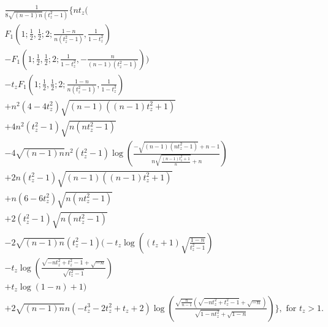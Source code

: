 \begin{multline}
  \label{eq:133}
  \frac{1}{8
   \sqrt{(n-1) n} \left(t_z^2-1\right)}
 \Bigg\{
 n t_z \Bigg(\\
   F_1\left(1;\frac{1}{2},\frac{1}{2};2;\frac{1-n}{n
       \left(t_z^2-1\right)},\frac{1}{1-t_z^2}\right)\\
   -F_1\left(1;\frac{1}{2},\frac{1}{2};2;
     \frac{1}{1-t_z^2},-\frac{n}{(n-1) \left(t_z^2-1\right)}\right)
 \Bigg)\\
 -t_z
   F_1\left(1;\frac{1}{2},\frac{1}{2};2;\frac{1-n}{n
       \left(t_z^2-1\right)},\frac{1}{1-t_z^2}\right)\\
   +n^2 (4-4 t_z^2)
   \sqrt{(n-1) \left((n-1) t_z^2+1\right)}\\
   +4 n^2 (t_z^2-1) \sqrt{n \left(n
       t_z^2-1\right)}\\
   -4 \sqrt{(n-1) n} n^2 \left(t_z^2-1\right) \log
   \left(\frac{-\sqrt{(n-1) \left(n t_z^2-1\right)}+n-1}{n \sqrt{\frac{(n-1)
           t_z^2+1}{n}}+n}\right)\\
   +2 n \left(t_z^2-1\right) \sqrt{(n-1) \left((n-1)
       t_z^2+1\right)}\\
   +n \left(6-6 t_z^2\right) \sqrt{n \left(n t_z^2-1\right)}\\
   +2
   \left(t_z^2-1\right) \sqrt{n \left(n t_z^2-1\right)}\\
   -2 \sqrt{(n-1) n}
   \left(t_z^2-1\right) \Bigg(-t_z \log \left((t_z+1)
     \sqrt{\frac{1-n}{t_z^2-1}}\right)\\
   -t_z \log \left(\frac{\sqrt{-n
         t_z^2+t_z^2-1}+\sqrt{-n}}{\sqrt{t_z^2-1}}\right)\\
   +t_z \log
   (1-n)+1
   \Bigg)\\
   +2 \sqrt{(n-1) n} n \left(-t_z^3-2 t_z^2+t_z+2\right) \log
   \left(\frac{\sqrt{\frac{n}{n-1}} \left(\sqrt{-n
           t_z^2+t_z^2-1}+\sqrt{-n}\right)}{\sqrt{1-n t_z^2}+\sqrt{1-n}}\right)
   \Bigg\}, \text{ for } t_z > 1.
\end{multline}

